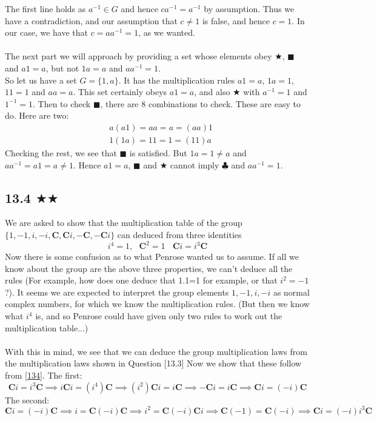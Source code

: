 The first line holds as $a^{-1}\in G$ and hence $c a^{-1}=a^{-1}$ by assumption. Thus we have a contradiction, and our assumption that $c\neq 1$ is false, and hence $c=1$. In our case, we have that $c=aa^{-1}=1$, as we wanted. \\ \\
The next part we will approach by providing a set whose elements obey $\bigstar$, $\blacksquare$ and $a1=a$, but not $1a=a$ and $aa^{-1}=1$.\\ So let us have a set $G=\{1,a\}$. It has the multiplication rules $a1=a$, $1 a=1$, $11=1$ and $aa=a$. This set certainly obeys $a1=a$, and also $\bigstar$ with $a^{-1}=1$ and $1^{-1}=1$. Then to check $\blacksquare$, there are 8 combinations to check. These are easy to do. Here are two:
\begin{align*}
&a(a1)=aa=a=(aa)1\\
&1(1a)=11=1=(11)a
\end{align*}
Checking the rest, we see that $\blacksquare$ is satisfied. But $1a=1\neq a$ and $aa^{-1}=a1=a\neq 1$. Hence $a1=a$, $\blacksquare$ and $\bigstar$ cannot imply $\clubsuit$ and $aa^{-1}=1$.


\subsection{13.4 $\bigstar \bigstar $}
We are asked to show that the multiplication table of the group $\{1,-1,i,-i,\mathbf{C},\mathbf{C}i,-\mathbf{C},-\mathbf{C}i\}$ can deduced from three identities
\begin{equation}\label{134}i^4=1, \ \ \ \mathbf{C}^2=1 \ \ \ \ \mathbf{C}i=i^3\mathbf{C}\end{equation}
 Now there is some confusion as to what Penrose wanted us to assume. If all we know about the group are the above three properties, we can't deduce all the rules (For example, how does one deduce that 1.1=1 for example, or that $i^2=-1$?). It seems we are expected to interpret the group elements $1,-1,i,-i$ as normal complex numbers, for which we know the multiplication rules. (But then we know what $i^4$ is, and so Penrose could have given only two rules to work out the multiplication table...)\\ \\ With this in mind, we see that we can deduce the group multiplication laws from the multiplication laws shown in Question [13.3] Now we show that these follow from \eqref{134}. The first:
$$
\mathbf{C}i=i^3\mathbf{C}\implies i\mathbf{C}i=(i^4)\mathbf{C}\implies (i^2)\mathbf{C} i =i\mathbf{C}\implies -\mathbf{C} i = i\mathbf{C}\implies \mathbf{C}i=(-i)\mathbf{C}$$
The second:
$$\mathbf{C}i=(-i)\mathbf{C}\implies i = \mathbf{C}(-i)\mathbf{C}\implies i^2=\mathbf{C}(-i)\mathbf{C}i\implies \mathbf{C}(-1)=\mathbf{C}(-i)\implies\mathbf{C}i=(-i)i^3\mathbf{C} $$


